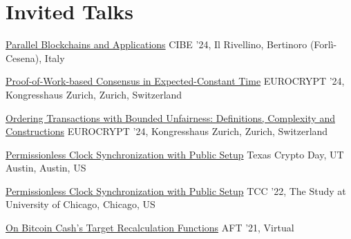 \section{Invited Talks}

{\href{https://cibe24.bici.events/home}{Parallel Blockchains and Applications}}
{}
{}
{}
{CIBE '24, Il Rivellino, Bertinoro (Forlì-Cesena), Italy}

{\href{https://youtu.be/uvAEvkGZymg?t=2400}{Proof-of-Work-based Consensus in Expected-Constant Time}}
{}
{}
{}
{EUROCRYPT '24, Kongresshaus Zurich, Zurich, Switzerland}

{\href{https://youtu.be/uvAEvkGZymg}{Ordering Transactions with Bounded Unfairness: Definitions, Complexity and Constructions}}
{}
{}
{}
{EUROCRYPT '24, Kongresshaus Zurich, Zurich, Switzerland}

{\href{https://texascryptoday.github.io/events/2-UTAustin.html}{Permissionless Clock Synchronization with Public Setup}}
{}
{}
{}
{Texas Crypto Day, UT Austin, Austin, US}

{\href{https://youtu.be/JUYzY-1mcYM}{Permissionless Clock Synchronization with Public Setup}}
{}
{}
{}
{TCC '22, The Study at University of Chicago, Chicago, US}

{{\href{https://youtu.be/5K6HNCtLPtk}{On Bitcoin Cash's Target Recalculation Functions}}}
{}
{}
{}
{AFT '21, Virtual}